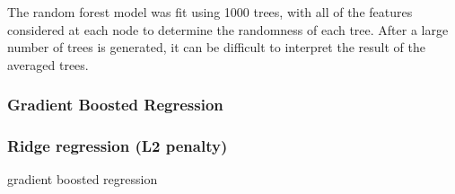 \documentclass[sigconf]{acmart}
\begin{document}
The random forest model was fit using 1000 trees, with all of the features 
considered at each node to determine the randomness of each tree. After a 
large number of trees is generated, it can be difficult to interpret the result 
of the averaged trees. 

\subsubsection{Gradient Boosted Regression} 





\subsubsection{Ridge regression (L2 penalty)} 
gradient boosted regression




\end{document}

